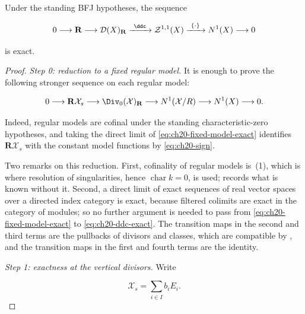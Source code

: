 \begin{theorem}\label{thm:ch20-ddc-exact}
Under the standing BFJ hypotheses, the sequence

\begin{equation}
\label{eq:ch20-ddc-exact}
 0\longrightarrow\mathbf R
 \longrightarrow\mathcal D(X)_{\mathbf R}
 \xrightarrow{\ \ddc\ }\mathcal Z^{1,1}(X)
 \xrightarrow{\ \{\cdot\}\ }N^1(X)
 \longrightarrow0
\end{equation}

is exact.
\end{theorem}

\begin{proof}
\emph{Step 0: reduction to a fixed regular model.}
It is enough to prove the following stronger sequence on each regular model:

\begin{equation}
\label{eq:ch20-fixed-model-exact}
 0\longrightarrow \mathbf R\mathcal X_s
 \longrightarrow \Div_0(\mathcal X)_{\mathbf R}
 \longrightarrow N^1(\mathcal X/R)
 \longrightarrow N^1(X)
 \longrightarrow0.
\end{equation}

Indeed, regular models are cofinal under the standing characteristic-zero
hypotheses, and taking the direct limit of
\eqref{eq:ch20-fixed-model-exact} identifies
$\mathbf R\mathcal X_s$ with the constant model functions by
\eqref{eq:ch20-sign}.

Two remarks on this reduction.  First, cofinality of regular models is
\,(1), which is where resolution of singularities,
hence $\operatorname{char}k=0$, is used;  records
what is known without it.  Second, a direct limit of exact sequences of
real vector spaces over a directed index category is exact, because
filtered colimits are exact in the category of modules; so no further
argument is needed to pass from \eqref{eq:ch20-fixed-model-exact} to
\eqref{eq:ch20-ddc-exact}.  The transition maps in the second and third
terms are the pullbacks of divisors and classes, which are compatible by
, and the transition maps in the first and
fourth terms are the identity.

\emph{Step 1: exactness at the vertical divisors.}
Write

\begin{equation}
\label{eq:ch20-special-fibre-components}
                       \mathcal X_s=\sum_{i\in I}b_iE_i.
\end{equation}


\end{proof}
